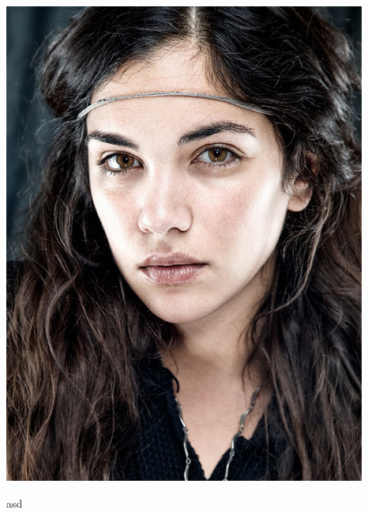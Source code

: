 \documentclass{article}
\begin{document}
\includegraphics[scale=0.2,angle=-45,angle=-45]{./images/amato}


\def\tokentwo{}
\futurelet\tokenone\tokentwo         
\tt\meaning\tokenone  

\makeatletter
\def\:{\let\@sptoken= } \: %

\: asd
\meaning\:
\makeatother
\end{document}
